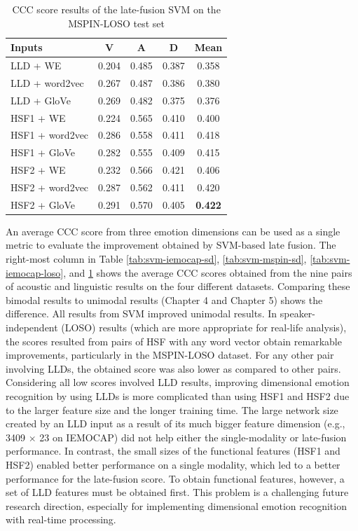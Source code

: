 \begin{table}[htbp]
\caption{CCC score results of the late-fusion SVM on the MSPIN-LOSO test set}
\begin{center}
 \label{tab:svm-mspin-loso}
 \begin{tabular}{l c c c c}
 \hline 
Inputs & V & A & D & Mean \\
 \hline
LLD    + WE        & 0.204 & 0.485 & 0.387 & 0.358 \\
LLD    + word2vec  & 0.267 & 0.487 & 0.386 & 0.380 \\
LLD    + GloVe     & 0.269 & 0.482 & 0.375 & 0.376 \\
HSF1   + WE        & 0.224 & 0.565 & 0.410 & 0.400 \\
HSF1   + word2vec  & 0.286 & 0.558 & 0.411 & 0.418 \\
HSF1   + GloVe     & 0.282 & 0.555 & 0.409 & 0.415 \\
HSF2   + WE        & 0.232 & 0.566 & 0.421 & 0.406 \\
HSF2   + word2vec  & 0.287 & 0.562 & 0.411 & 0.420 \\
HSF2   + GloVe     & 0.291 & 0.570 & 0.405 & \textbf{0.422} \\ 
 \hline
\end{tabular}
\end{center}
\end{table} 


An average CCC score from three emotion dimensions can be used as a single
metric to evaluate the improvement obtained by SVM-based late fusion. The
right-most column in Table \ref{tab:svm-iemocap-sd}, \ref{tab:svm-mspin-sd},
\ref{tab:svm-iemocap-loso}, and \ref{tab:svm-mspin-loso} shows the average CCC
scores obtained from the nine pairs of acoustic and linguistic results on the
four different datasets.  Comparing these bimodal results to unimodal results
(Chapter 4 and Chapter 5) shows the difference. All results from SVM improved
unimodal results. In speaker-independent (LOSO) results (which are more
appropriate for real-life analysis), the scores resulted from pairs of HSF with
any word vector obtain remarkable improvements, particularly in the MSPIN-LOSO
dataset.  For any other pair involving LLDs, the obtained score was also lower
as compared to other pairs.  Considering all low scores involved LLD results,
improving dimensional emotion recognition by using LLDs is more complicated
than using HSF1 and HSF2 due to the larger feature size and the longer training
time. The large network size created by an LLD input as a result of its much
bigger feature dimension (e.g., 3409 $\times$ 23 on IEMOCAP) did not help
either the single-modality or late-fusion performance.  In contrast, the small
sizes of the functional features (HSF1 and HSF2) enabled better performance on
a single modality, which led to a better performance for the late-fusion score.
To obtain functional features, however, a set of LLD features must be obtained
first. This problem is a challenging future research direction, especially for
implementing dimensional emotion recognition with real-time processing. 

